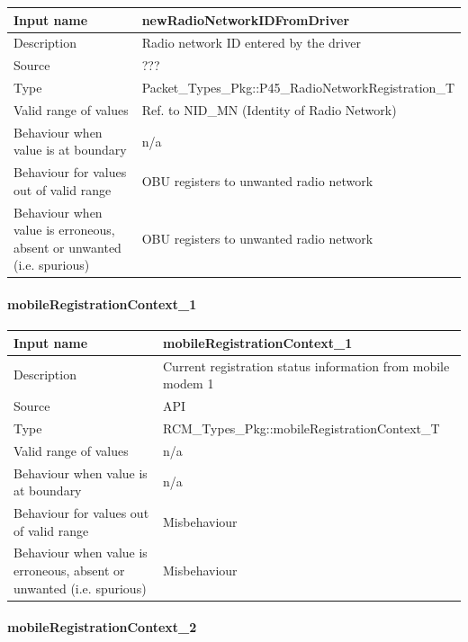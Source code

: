 \begin{longtable}{p{}p{}}
	\toprule
	Input name				& newRadioNetworkIDFromDriver \\
	\midrule
	Description				& Radio network ID entered by the driver \\
	\midrule
	Source					& ??? \\ 
	\midrule
	Type					& Packet\_Types\_Pkg::P45\_RadioNetworkRegistration\_T \\
	\midrule
	Valid range of values	& Ref. to NID\_MN (Identity of Radio Network)  \\
	\midrule
	Behaviour when value is at boundary	& n/a \\
	\midrule
	Behaviour for values out of valid range	& OBU registers to unwanted radio network \\
	\midrule
	Behaviour when value is erroneous, absent or unwanted (i.e. spurious) & OBU registers to unwanted radio network  \\
	\bottomrule
\end{longtable}

\paragraph{mobileRegistrationContext\_1}

\begin{longtable}{p{}p{}}
	\toprule
	Input name				& mobileRegistrationContext\_1 \\
	\midrule
	Description				& Current registration status information from mobile modem 1 \\
	\midrule
	Source					& API \\ 
	\midrule
	Type					& RCM\_Types\_Pkg::mobileRegistrationContext\_T \\
	\midrule
	Valid range of values	& n/a \\
	\midrule
	Behaviour when value is at boundary	& n/a \\
	\midrule
	Behaviour for values out of valid range	& Misbehaviour \\
	\midrule
	Behaviour when value is erroneous, absent or unwanted (i.e. spurious) & Misbehaviour \\
	\bottomrule
\end{longtable}

\paragraph{mobileRegistrationContext\_2}

